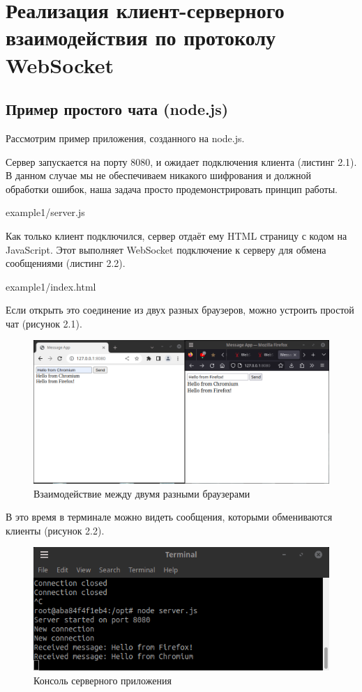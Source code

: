 \chapter{Реализация клиент-серверного взаимодействия по протоколу WebSocket}

\section{Пример простого чата (node.js)}

Рассмотрим пример приложения, созданного на node.js.

Сервер запускается на порту 8080, и ожидает подключения клиента (листинг 2.1). В данном случае мы не обеспечиваем никакого шифрования и должной обработки ошибок, наша задача просто продемонстрировать принцип работы.


{example1/server.js}

Как только клиент подключился, сервер отдаёт ему HTML страницу с кодом на JavaScript. Этот выполняет WebSocket подключение к серверу для обмена сообщениями (листинг 2.2).


{example1/index.html}

Если открыть это соединение из двух разных браузеров, можно устроить простой чат (рисунок 2.1).

\begin{figure}[H]
\centering
\includegraphics[scale=0.5]{res/browsers1}
\caption{Взаимодействие между двумя разными браузерами}
\end{figure}

В это время в терминале можно видеть сообщения, которыми обмениваются клиенты (рисунок 2.2).

\begin{figure}[H]
\centering
\includegraphics[scale=1]{res/console1}
\caption{Консоль серверного приложения}
\end{figure}

